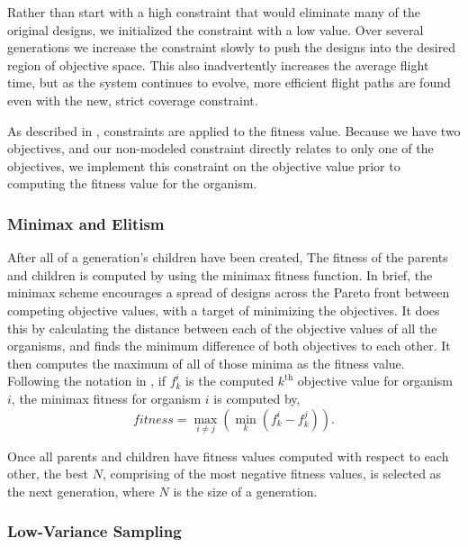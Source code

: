 \documentclass[letterpaper, 10 pt, conference]{ieeeconf}  %
\begin{document}
Rather than start with a high constraint that would eliminate many of the original designs, we initialized the constraint with a low value. Over several generations we increase the constraint slowly to push the designs into the desired region of objective space. This also inadvertently increases the average flight time, but as the system continues to evolve, more efficient flight paths are found even with the new, strict coverage constraint.

As described in \cite{Parkinson2019}, constraints are applied to the fitness value. Because we have two objectives, and our non-modeled constraint directly relates to only one of the objectives, we implement this constraint on the objective value prior to computing the fitness value for the organism.

\subsubsection{Minimax and Elitism}

After all of a generation's children have been created, The fitness of the parents and children is computed by using the minimax fitness function. In brief, the minimax scheme encourages a spread of designs across the Pareto front between competing objective values, with a target of minimizing the objectives. It does this by calculating the distance between each of the objective values of all the organisms, and finds the minimum difference of both objectives to each other. It then computes the maximum of all of those minima as the fitness value. Following the notation in \cite{Parkinson2019}, if $f_k^i$ is the computed $k^{\mathrm{th}}$ objective value for organism $i$, the minimax fitness for organism $i$ is computed by,
\begin{equation}%
    fitness = \max_{i \neq j}\left(\min_{k}\left(f_k^i - f_k^j\right)\right).
\end{equation}

Once all parents and children have fitness values computed with respect to each other, the best $N$, comprising of the most negative fitness values, is selected as the next generation, where $N$ is the size of a generation.

\subsubsection{Low-Variance Sampling}
\end{document}
